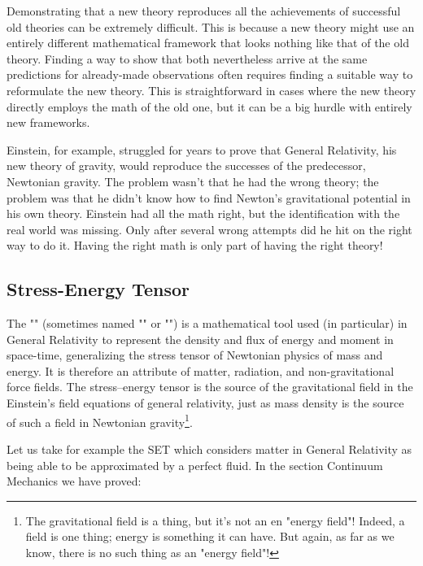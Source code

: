 	Demonstrating that a new theory reproduces all the achievements of successful old theories can be extremely difficult. This is because a new theory might use an entirely different mathematical framework that looks nothing like that of the old theory. Finding a way to show that both nevertheless arrive at the same predictions for already-made observations often requires finding a suitable way to reformulate the new theory. This is straightforward in cases where the new theory directly employs the math of the old one, but it can be a big hurdle with entirely new frameworks.

	Einstein, for example, struggled for years to prove that General Relativity, his new theory of gravity, would reproduce the successes of the predecessor, Newtonian gravity. The problem wasn't that he had the wrong theory; the problem was that he didn't know how to find Newton's gravitational potential in his own theory. Einstein had all the math right, but the identification with the real world was missing. Only after several wrong attempts did he hit on the right way to do it. Having the right math is only part of having the right theory!
	
	\subsection{Stress-Energy Tensor}
	The "" (sometimes named "" or "\label{energy momentum tensor}") is a mathematical tool used (in particular) in General Relativity to represent the density and flux of energy and moment in space-time, generalizing the stress tensor of Newtonian physics of mass and energy. It is therefore an attribute of matter, radiation, and non-gravitational force fields. The stress–energy tensor is the source of the gravitational field in the Einstein's field equations of general relativity, just as mass density is the source of such a field in Newtonian gravity\footnote{The gravitational field is a thing, but it's not an en "energy field"! Indeed, a field is one thing; energy is something it can have. But again, as far as we know, there is no such thing as an "energy field"! }.
	
	Let us take for example the SET which considers matter in General Relativity as being able to be approximated by a perfect fluid. In the section Continuum Mechanics we have proved:
	
